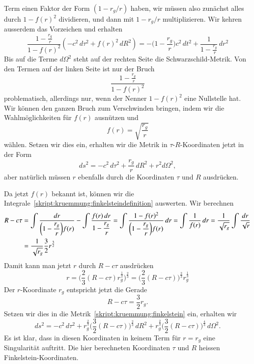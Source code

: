 Term einen Faktor der Form $(1-r_g/r)$ haben, wir müssen also zunächst
alles durch $1-f(r)^2$ dividieren, und dann mit $1-r_g/r$ multiplizieren.
Wir kehren ausserdem das Vorzeichen und erhalten
\[
\frac{\displaystyle 1-\frac{r_g}{r}}{1-f(r)^2}
(-c^2\,d\tau^2 + f(r)^2\,dR^2)
=
-\biggl(1-\frac{r_g}{r}\biggr)c^2\,dt^2
+\frac{1}{\displaystyle 1-\frac{r_g}{r}}\,dr^2
\]
Bis auf die Terme $d\Omega^2$ steht auf der rechten Seite die
Schwarzschild-Metrik.
Von den Termen auf der linken Seite ist nur der Bruch
\[
\frac{\displaystyle 1-\frac{r_g}{r}}{1-f(r)^2}
\]
problematisch, allerdings nur, wenn der Nenner $1-f(r)^2$ eine
Nullstelle hat.
Wir können den ganzen Bruch zum Verschwinden bringen, indem wir die
Wahlmöglichkeiten für $f(r)$ ausnützen und 
\[
f(r)=\sqrt{\frac{r_g}{r}}
\]
wählen.
Setzen wir dies ein, erhalten wir die Metrik in $\tau$-$R$-Koordinaten
jetzt in der Form
\begin{equation}
ds^2
=
-c^2\,d\tau^2 + \frac{r_g}{r}\,dR^2 + r^2 d\Omega^2,
\label{skript:kruemmung:finkelstein}
\end{equation}
aber natürlich müssen $r$ ebenfalls durch die Koordinaten $\tau$ und $R$
ausdrücken.

Da jetzt $f(r)$ bekannt ist, können wir die
Integrale~\eqref{skript:kruemmung:finkelsteindefinition} auswerten.
Wir berechnen
\begin{align*}
R-c\tau
&=
\int\frac{dr}{\displaystyle \biggl(1-\frac{r_g}{r}\biggr)f(r)}
- \int\frac{f(r)\,dr}{\displaystyle 1-\frac{r_g}{r}}
=
\int\frac{1-f(r)^2}{\displaystyle\biggl(1-\frac{r_g}{r}\biggr) f(r)}\,dr
=
\int\frac{1}{f(r)}\,dr
=
\frac{1}{\sqrt{\mathstrut r_g}}\int\frac{dr}{\sqrt{r}}
\\
&=
\frac{1}{\sqrt{\mathstrut r_g}} \frac{3}{2}r^{\frac{3}{2}}
\end{align*}
Damit kann man jetzt $r$ durch $R-c\tau$ ausdrücken
\[
r
=
\biggl(\frac{2}{3}(R-c\tau)r_g^{\frac{1}{2}}\biggr)^{\frac23}
=
\biggl(\frac{2}{3}(R-c\tau)\biggr)^{\frac23} r_g^{\frac13}
\]
Der $r$-Koordinate $r_g$ entspricht jetzt die Gerade
\[
R-c\tau = \frac32 r_g.
\]
Setzen wir dies in die Metrik~\eqref{skript:kruemmung:finkelstein}
ein, erhalten
wir
\[
ds^2
=
-c^2 \,d\tau^2
+r_g^{\frac23}\biggl(\frac32(R-c\tau)\biggr)^{\frac23}\,dR^2
+ r_g^{\frac23}\biggl(\frac32(R-c\tau)\biggr)^{\frac43}\,d\Omega^2.
\]
Es ist klar, dass in diesen Koordinaten in keinem Term für $r=r_g$
eine Singularität auftritt.
Die hier berechneten Koordinaten $\tau$ und $R$ heissen
Finkelstein-Koordinaten.

